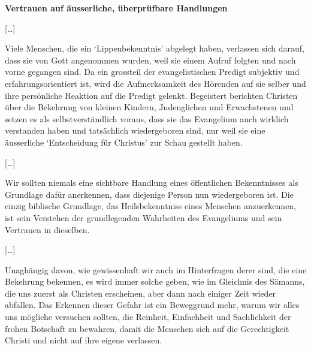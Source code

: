 \documentclass[
  12pt,
]{krantz}
\begin{document}
\textbf{Vertrauen auf äusserliche, überprüfbare Handlungen}

{[}\ldots{]}

Viele Menschen, die ein `Lippenbekenntnis' abgelegt haben, verlassen sich
darauf, dass sie von Gott angenommen wurden, weil sie einem Aufruf folgten und
nach vorne gegangen sind. Da ein grossteil der evangelistischen Predigt
subjektiv und erfahrungsorientiert ist, wird die Aufmerksamkeit des Hörenden
auf sie selber und ihre persönliche Reaktion auf die Predigt gelenkt.
Begeistert berichten Christen über die Bekehrung von kleinen Kindern,
Judenglichen und Erwachstenen und setzen es als selbstverständlich voraus,
dass sie das Evangelium auch wirklich verstanden haben und tatsächlich
wiedergeboren sind, nur weil sie eine äusserliche `Entscheidung für Christus'
zur Schau gestellt haben.

{[}\ldots{]}

Wir sollten niemals eine sichtbare Handlung eines öffentlichen Bekenntnisses
als Grundlage dafür anerkennen, dass diejenige Person nun wiedergeboren ist.
Die einzig biblische Grundlage, das Heilsbekenntniss eines Menschen
anzuerkennen, ist sein Verstehen der grundlegenden Wahrheiten des Evangeliums
und sein Vertrauen in dieselben.

{[}\ldots{]}

Unaghängig davon, wie gewissenhaft wir auch im Hinterfragen derer sind, die
eine Bekehrung bekennen, es wird immer solche geben, wie im Gleichnis des
Sämanns, die uns zuerst als Christen erscheinen, aber dann nach einiger
Zeit wieder abfallen. Das Erkennen dieser Gefahr ist ein Beweggrund mehr,
warum wir alles uns mögliche versuchen sollten, die Reinheit, Einfachheit und
Sachlichkeit der frohen Botschaft zu bewahren, damit die Menschen sich auf
die Gerechtigkeit Christi und nicht auf ihre eigene verlassen.

  

\printindex
\end{document}
